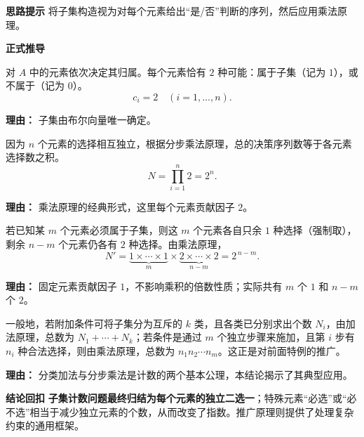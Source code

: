 \begin{proofbox}
	\textbf{\textcolor{CProof}{思路提示}}
	将子集构造视为对每个元素给出“是/否”判断的序列，然后应用乘法原理。

	\medskip
	\textbf{\textcolor{CProof}{正式推导}}
	\begin{description}[style=nextline, leftmargin=2.8em, labelsep=0.5em, itemsep=0.55em]
		\item[\textbf{步骤一（元素决策模型）：}] 对 $A$ 中的元素依次决定其归属。每个元素恰有 $2$ 种可能：属于子集（记为 $1$），或不属于（记为 $0$）。
			\[
				c_i = 2 \quad (i=1,\dots,n).
			\]
			\par\textbf{理由：} 子集由布尔向量唯一确定。
		\item[\textbf{步骤二（应用乘法原理）：}] 因为 $n$ 个元素的选择相互独立，根据分步乘法原理，总的决策序列数等于各元素选择数之积。
			\[
				N = \prod_{i=1}^{n} 2 = 2^n.
			\]
			\par\textbf{理由：} 乘法原理的经典形式，这里每个元素贡献因子 $2$。
		\item[\textbf{步骤三（包含指定元素的情形）：}] 若已知某 $m$ 个元素必须属于子集，则这 $m$ 个元素各自只余 $1$ 种选择（强制取），剩余 $n-m$ 个元素仍各有 $2$ 种选择。由乘法原理，
			\[
				N' = \underbrace{1 \times \cdots \times 1}_{m} \times \underbrace{2 \times \cdots \times 2}_{n-m} = 2^{\,n-m}.
			\]
			\par\textbf{理由：} 固定元素贡献因子 $1$，不影响乘积的倍数性质；实际共有 $m$ 个 $1$ 和 $n-m$ 个 $2$。
		\item[\textbf{步骤四（一般原理的自然导出）：}] 一般地，若附加条件可将子集分为互斥的 $k$ 类，且各类已分别求出个数 $N_i$，由加法原理，总数为 $N_1+\cdots+N_k$；若条件是通过 $m$ 个独立步骤来施加，且第 $i$ 步有 $n_i$ 种合法选择，则由乘法原理，总数为 $n_1 n_2 \cdots n_m$。这正是对前面特例的推广。
			\par\textbf{理由：} 分类加法与分步乘法是计数的两个基本公理，本结论揭示了其典型应用。
	\end{description}

	\medskip
	\textbf{\textcolor{CProof}{结论回扣}}
	\textbf{子集计数问题最终归结为每个元素的独立二选一}；特殊元素“必选”或“必不选”相当于减少独立元素的个数，从而改变了指数。推广原理则提供了处理复杂约束的通用框架。
\end{proofbox}
